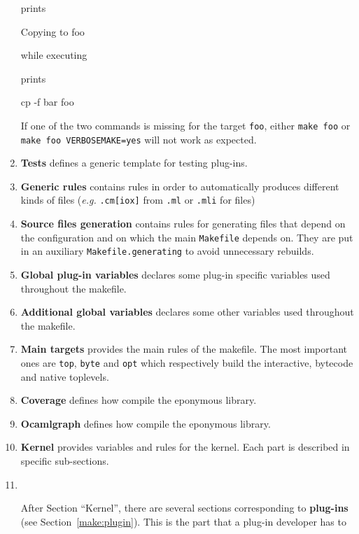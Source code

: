 \begin{enumerate}
\begin{example}
prints
\begin{shell}
Copying to  foo
\end{shell}
while executing
prints
\begin{shell}
cp -f bar foo
\end{shell}
If one of the two commands is missing for the target \texttt{foo}, either
\texttt{make foo} or \texttt{make foo VERBOSEMAKE=yes} will not work as
expected.
\end{example}
\item \textbf{Tests} defines a generic template for testing plug-ins.
\item \textbf{Generic rules} contains rules in order to automatically produces
  different kinds of files (\emph{e.g.} \texttt{.cm[iox]} from \texttt{.ml} or
  \texttt{.mli} for \ocaml files)
\item \textbf{Source files generation} contains rules for generating files
  that depend on the configuration and on which the main \texttt{Makefile}
  depends on. They are put in an auxiliary \texttt{Makefile.generating} to
  avoid unnecessary rebuilds.
\item \textbf{Global plug-in variables} declares some plug-in specific variables
  used throughout the makefile.
\item \textbf{Additional global variables} declares some other variables used
  throughout the makefile.
\item \textbf{Main targets} provides the main rules of the makefile. The most
  important ones are \texttt{top}, \texttt{byte} and \texttt{opt} which
  respectively build the \framac interactive, bytecode and native toplevels.
\item \textbf{Coverage} defines how compile the eponymous library.
\item \textbf{Ocamlgraph} defines how compile the eponymous library.
\item \textbf{\framac Kernel} provides variables and rules for the \framac
  kernel. Each part is described in specific sub-sections.
\item ~\\[-6mm]
  \begin{important}
    After Section ``Kernel'', there are several sections corresponding to
    \textbf{plug-ins} (see
    Section~\ref{make:plugin}). This is the part that a plug-in developer has to

\end{important}
\end{enumerate}
